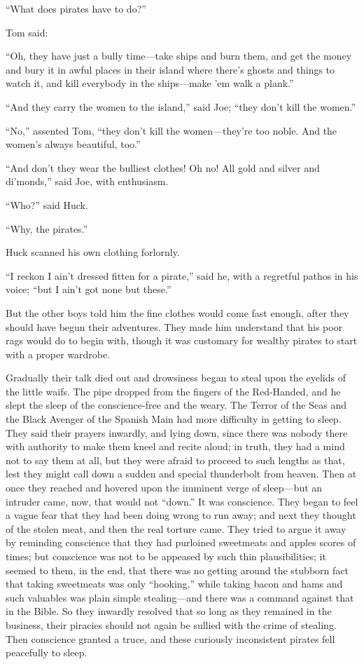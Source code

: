\documentclass{book}
\begin{document}
“What does pirates have to do?”

Tom said:

“Oh, they have just a bully time—take ships and burn them, and get the money and bury it in awful places in their island where there’s ghosts and things to watch it, and kill everybody in the ships—make ’em walk a plank.”

“And they carry the women to the island,” said Joe; “they don’t kill the women.”

“No,” assented Tom, “they don’t kill the women—they’re too noble. And the women’s always beautiful, too.”

“And don’t they wear the bulliest clothes! Oh no! All gold and silver and di’monds,” said Joe, with enthusiasm.

“Who?” said Huck.

“Why, the pirates.”

Huck scanned his own clothing forlornly.

“I reckon I ain’t dressed fitten for a pirate,” said he, with a regretful pathos in his voice; “but I ain’t got none but these.”

But the other boys told him the fine clothes would come fast enough, after they should have begun their adventures. They made him understand that his poor rags would do to begin with, though it was customary for wealthy pirates to start with a proper wardrobe.

Gradually their talk died out and drowsiness began to steal upon the eyelids of the little waifs. The pipe dropped from the fingers of the Red-Handed, and he slept the sleep of the conscience-free and the weary. The Terror of the Seas and the Black Avenger of the Spanish Main had more difficulty in getting to sleep. They said their prayers inwardly, and lying down, since there was nobody there with authority to make them kneel and recite aloud; in truth, they had a mind not to say them at all, but they were afraid to proceed to such lengths as that, lest they might call down a sudden and special thunderbolt from heaven. Then at once they reached and hovered upon the imminent verge of sleep—but an intruder came, now, that would not “down.” It was conscience. They began to feel a vague fear that they had been doing wrong to run away; and next they thought of the stolen meat, and then the real torture came. They tried to argue it away by reminding conscience that they had purloined sweetmeats and apples scores of times; but conscience was not to be appeased by such thin plausibilities; it seemed to them, in the end, that there was no getting around the stubborn fact that taking sweetmeats was only “hooking,” while taking bacon and hams and such valuables was plain simple stealing—and there was a command against that in the Bible. So they inwardly resolved that so long as they remained in the business, their piracies should not again be sullied with the crime of stealing. Then conscience granted a truce, and these curiously inconsistent pirates fell peacefully to sleep.
\end{document}

